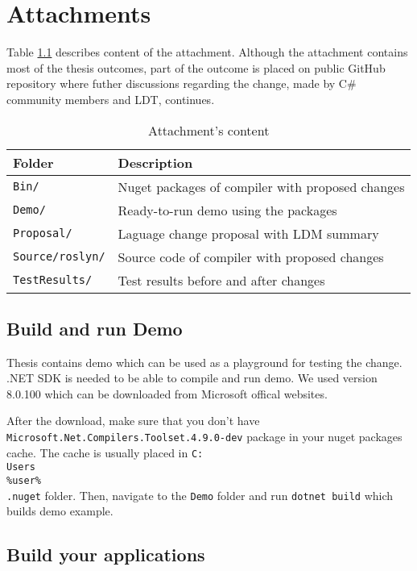 \chapter{Attachments}

Table \ref{img80:attachment} describes content of the attachment.
Although the attachment contains most of the thesis outcomes, part of the outcome is placed on public GitHub repository where futher discussions regarding the change, made by C\# community members and \ac{LDT}, continues.

\begin{table}[h]
\centering
\begin{tabular}{ | m{11em} | m{22em}| } 
\hline
Folder & Description \\
\hline
\texttt{Bin/} & Nuget packages of compiler with proposed changes \\
\texttt{Demo/} & Ready-to-run demo using the packages \\
\texttt{Proposal/} & Laguage change proposal with LDM summary \\
\texttt{Source/roslyn/} & Source code of compiler with proposed changes \\
\texttt{TestResults/} & Test results before and after changes \\
\hline
\end{tabular}
\caption{Attachment's content }
\label{img80:attachment}
\end{table}

\section{Build and run Demo}

Thesis contains demo which can be used as a playground for testing the change.
.NET SDK is needed to be able to compile and run demo.
We used version 8.0.100 which can be downloaded from Microsoft offical websites.
\par
After the download, make sure that you don't have \texttt{Microsoft.Net.Compilers.Toolset.4.9.0-dev} package in your nuget packages cache.
The cache is usually placed in \texttt{C:\\Users\\\%user\%\\.nuget} folder.
Then, navigate to the \texttt{Demo} folder and run \texttt{dotnet build} which builds demo example.

\section{Build your applications}

